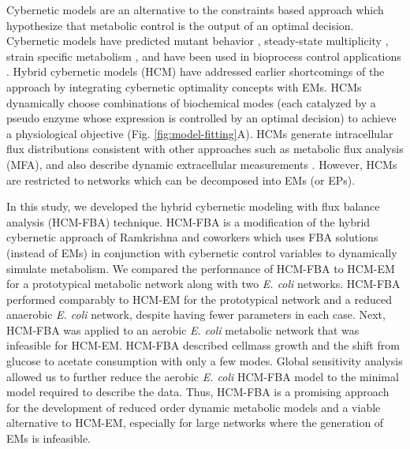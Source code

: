 \documentclass[10pt,twocolumn,twoside,final]{IEEEtran}
\begin{document}
Cybernetic models are an alternative to the constraints based approach which hypothesize that metabolic control is the output of an optimal decision.
Cybernetic models have predicted mutant behavior \cite{1999_varner_ramkrishna_MetaEng,Song:2012aa}, steady-state multiplicity \cite{2012_kim_ramkrishna_BiotechProg}, strain specific metabolism \cite{Song:2011aa}, and have been used in bioprocess control applications \cite{Gadkar:2003aa}.
Hybrid cybernetic models (HCM) have addressed earlier shortcomings of the approach by integrating cybernetic optimality concepts with EMs.
HCMs dynamically choose combinations of biochemical modes (each catalyzed by a pseudo enzyme whose expression is controlled by an optimal decision) to achieve a physiological objective (Fig. \ref{fig:model-fitting}A).
HCMs generate intracellular flux distributions consistent with other approaches such as metabolic flux analysis (MFA), and also describe dynamic extracellular measurements \cite{2008_kim_varner_ramkrishna_BiotechProg}.
However, HCMs are restricted to networks which can be decomposed into EMs (or EPs).


In this study, we developed the hybrid cybernetic modeling with flux balance analysis (HCM-FBA) technique.
HCM-FBA is a modification of the hybrid cybernetic approach of Ramkrishna and coworkers \cite{2008_kim_varner_ramkrishna_BiotechProg} which uses FBA solutions
(instead of EMs) in conjunction with cybernetic control variables to dynamically simulate metabolism.
We compared the performance of HCM-FBA to HCM-EM for a prototypical metabolic network along with two \emph{E. coli} networks.
HCM-FBA performed comparably to HCM-EM for the prototypical network and a reduced anaerobic \textit{E. coli} network, despite having fewer parameters in each case.
Next, HCM-FBA was applied to an aerobic \textit{E. coli} metabolic network that was infeasible for HCM-EM.
HCM-FBA described cellmass growth and the shift from glucose to acetate consumption with only a few modes.
Global sensitivity analysis allowed us to further reduce the aerobic \textit{E. coli} HCM-FBA model to the minimal model required to describe the data.
Thus, HCM-FBA is a promising approach for the development of reduced order dynamic metabolic models
and a viable alternative to HCM-EM, especially for large networks where the generation of EMs is infeasible.
\end{document}
